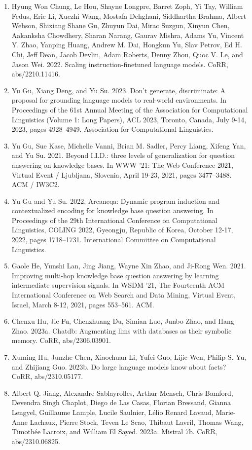 \documentclass[11pt,UTF8,fontset=fandol]{ctexart}
\begin{document}
\begin{enumerate}[leftmargin=2em]
\item Hyung Won Chung, Le Hou, Shayne Longpre, Barret Zoph, Yi Tay, William Fedus, Eric Li, Xuezhi Wang, Mostafa Dehghani, Siddhartha Brahma, Albert Webson, Shixiang Shane Gu, Zhuyun Dai, Mirac Suzgun, Xinyun Chen, Aakanksha Chowdhery, Sharan Narang, Gaurav Mishra, Adams Yu, Vincent Y. Zhao, Yanping Huang, Andrew M. Dai, Hongkun Yu, Slav Petrov, Ed H. Chi, Jeff Dean, Jacob Devlin, Adam Roberts, Denny Zhou, Quoc V. Le, and Jason Wei. 2022. Scaling instruction-finetuned language models. CoRR, abs/2210.11416.
\item Yu Gu, Xiang Deng, and Yu Su. 2023. Don't generate, discriminate: A proposal for grounding language models to real-world environments. In Proceedings of the 61st Annual Meeting of the Association for Computational Linguistics (Volume 1: Long Papers), ACL 2023, Toronto, Canada, July 9-14, 2023, pages 4928--4949. Association for Computational Linguistics.
\item Yu Gu, Sue Kase, Michelle Vanni, Brian M. Sadler, Percy Liang, Xifeng Yan, and Yu Su. 2021. Beyond I.I.D.: three levels of generalization for question answering on knowledge bases. In WWW '21: The Web Conference 2021, Virtual Event / Ljubljana, Slovenia, April 19-23, 2021, pages 3477--3488. ACM / IW3C2.
\item Yu Gu and Yu Su. 2022. Arcaneqa: Dynamic program induction and contextualized encoding for knowledge base question answering. In Proceedings of the 29th International Conference on Computational Linguistics, COLING 2022, Gyeongju, Republic of Korea, October 12-17, 2022, pages 1718--1731. International Committee on Computational Linguistics.
\item Gaole He, Yunshi Lan, Jing Jiang, Wayne Xin Zhao, and Ji-Rong Wen. 2021. Improving multi-hop knowledge base question answering by learning intermediate supervision signals. In WSDM '21, The Fourteenth ACM International Conference on Web Search and Data Mining, Virtual Event, Israel, March 8-12, 2021, pages 553--561. ACM.
\item Chenxu Hu, Jie Fu, Chenzhuang Du, Simian Luo, Junbo Zhao, and Hang Zhao. 2023a. Chatdb: Augmenting llms with databases as their symbolic memory. CoRR, abs/2306.03901.
\item Xuming Hu, Junzhe Chen, Xiaochuan Li, Yufei Guo, Lijie Wen, Philip S. Yu, and Zhijiang Guo. 2023b. Do large language models know about facts? CoRR, abs/2310.05177.
\item Albert Q. Jiang, Alexandre Sablayrolles, Arthur Mensch, Chris Bamford, Devendra Singh Chaplot, Diego de Las Casas, Florian Bressand, Gianna Lengyel, Guillaume Lample, Lucile Saulnier, Lélio Renard Lavaud, Marie-Anne Lachaux, Pierre Stock, Teven Le Scao, Thibaut Lavril, Thomas Wang, Timothée Lacroix, and William El Sayed. 2023a. Mistral 7b. CoRR, abs/2310.06825.

\end{enumerate}
\end{document}

